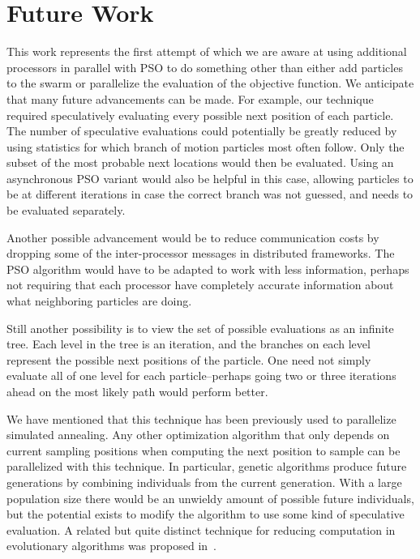 \documentclass[conference,letterpaper]{IEEEtran}
\begin{document}
\section{Future Work}
\label{sec:future}

This work represents the first attempt of which we are aware at using
additional processors in parallel with PSO to do something other than either
add particles to the swarm or parallelize the evaluation of the objective
function.  We anticipate that many future advancements can be made.  For
example, our technique required speculatively evaluating every possible next
position of each particle.  The number of speculative evaluations could
potentially be greatly reduced by using statistics for which branch of motion
particles most often follow.  Only the subset of the most probable next
locations would then be evaluated.  Using an asynchronous PSO variant would
also be helpful in this case, allowing particles to be at different iterations
in case the correct branch was not guessed, and needs to be evaluated
separately.

Another possible advancement would be to reduce communication costs by dropping
some of the inter-processor messages in distributed frameworks.  The PSO
algorithm would have to be adapted to work with less information, perhaps not
requiring that each processor have completely accurate information about what
neighboring particles are doing.

Still another possibility is to view the set of possible evaluations as an
infinite tree.  Each level in the tree is an iteration, and the branches on
each level represent the possible next positions of the particle.  One need not
simply evaluate all of one level for each particle--perhaps going two or three
iterations ahead on the most likely path would perform better.

We have mentioned that this technique has been previously used to parallelize
simulated annealing.  Any other optimization algorithm that only depends on 
current sampling positions when computing the next position to sample can be
parallelized with this technique.  In particular, genetic algorithms produce
future generations by combining individuals from the current generation.  With
a large population size there would be an unwieldy amount of possible future
individuals, but the potential exists to modify the algorithm to use some kind
of speculative evaluation.  A related but quite distinct technique for reducing
computation in evolutionary algorithms was proposed in~\cite{poli-ai06}.
\end{document}

